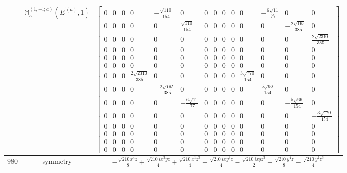 \documentclass[fleqn,8pt,landscape]{jsarticle}
\begin{document}
\begin{longtable}{ccc}
$  $ & $ \mathbb{M}_{5}^{(1,-1;a)}(E^{\prime(a)},1) $ & $ \begin{bmatrix} 0 & 0 & 0 & 0 & - \frac{\sqrt{110}}{154} & 0 & 0 & 0 & 0 & 0 & 0 & - \frac{6 \sqrt{11}}{77} & 0 & 0 \\ 0 & 0 & 0 & 0 & 0 & \frac{\sqrt{110}}{154} & 0 & 0 & 0 & 0 & 0 & 0 & - \frac{2 \sqrt{165}}{385} & 0 \\ 0 & 0 & 0 & 0 & 0 & 0 & 0 & 0 & 0 & 0 & 0 & 0 & 0 & \frac{2 \sqrt{2310}}{385} \\ 0 & 0 & 0 & 0 & 0 & 0 & 0 & 0 & 0 & 0 & 0 & 0 & 0 & 0 \\ 0 & 0 & 0 & 0 & 0 & 0 & 0 & 0 & 0 & 0 & 0 & 0 & 0 & 0 \\ 0 & 0 & 0 & 0 & 0 & 0 & 0 & 0 & 0 & 0 & 0 & 0 & 0 & 0 \\ 0 & 0 & 0 & \frac{2 \sqrt{2310}}{385} & 0 & 0 & 0 & 0 & 0 & 0 & \frac{3 \sqrt{770}}{154} & 0 & 0 & 0 \\ 0 & 0 & 0 & 0 & - \frac{2 \sqrt{165}}{385} & 0 & 0 & 0 & 0 & 0 & 0 & \frac{5 \sqrt{66}}{154} & 0 & 0 \\ 0 & 0 & 0 & 0 & 0 & - \frac{6 \sqrt{11}}{77} & 0 & 0 & 0 & 0 & 0 & 0 & - \frac{5 \sqrt{66}}{154} & 0 \\ 0 & 0 & 0 & 0 & 0 & 0 & 0 & 0 & 0 & 0 & 0 & 0 & 0 & - \frac{3 \sqrt{770}}{154} \\ 0 & 0 & 0 & 0 & 0 & 0 & 0 & 0 & 0 & 0 & 0 & 0 & 0 & 0 \\ 0 & 0 & 0 & 0 & 0 & 0 & 0 & 0 & 0 & 0 & 0 & 0 & 0 & 0 \\ 0 & 0 & 0 & 0 & 0 & 0 & 0 & 0 & 0 & 0 & 0 & 0 & 0 & 0 \\ 0 & 0 & 0 & 0 & 0 & 0 & 0 & 0 & 0 & 0 & 0 & 0 & 0 & 0 \end{bmatrix} $ \\ \hline
$ 980 $ & $ \text{symmetry} $ & $ - \frac{\sqrt{210} x^{4} z}{8} + \frac{\sqrt{210} i x^{3} y z}{4} + \frac{\sqrt{210} x^{2} z^{3}}{4} + \frac{\sqrt{210} i x y^{3} z}{4} - \frac{\sqrt{210} i x y z^{3}}{2} + \frac{\sqrt{210} y^{4} z}{8} - \frac{\sqrt{210} y^{2} z^{3}}{4} $ \\

\end{longtable}
\end{document}
